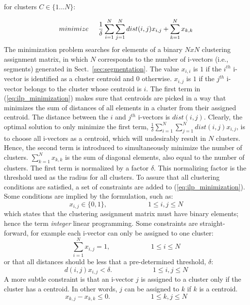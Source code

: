 for clusters $C \in \{1 ... N\}$:

\begin{equation}
\label{eq:ilp_minimization}
minimize \hspace{0.2in} \frac{1}{\delta}\sum\limits_{i=1}^{N}\sum\limits_{j=1}^{N}dist(i,j)x_{i,j} + \sum\limits_{k=1}^{N}x_{k,k}
\end{equation}
The minimization problem searches for elements of a binary $N x N$ clustering assignment matrix, in which $N$ corresponds to the number of i-vectors (i.e., segments) generated in Sect.~\ref{sec:segmentation}. 
The value $x_{i,i}$ is $1$ if the $i^{th}$ i-vector is identified as a cluster centroid and $0$ otherwise. 
$x_{i,j}$ is $1$ if the $j^{th}$ i-vector belongs to the cluster whose centroid is $i$. 
The first term in (\ref{eq:ilp_minimization}) makes sure that centroids are picked in a way that minimizes the sum of distances of all elements in a cluster from their assigned centroid. 
The distance between the $i$ and $j^{th}$ i-vectors is $dist(i,j)$. 
Clearly, the optimal solution to only minimize the first term, $\frac{1}{\delta}\sum\limits_{i=1}^{N}\sum\limits_{j=1}^{N}dist(i,j)x_{i,j}$, is to choose all i-vectors as a centroid, which will undesirably result in $N$ clusters. 
Hence, the second term is introduced to simultaneously minimize the number of clusters. $\sum\limits_{k=1}^{N}x_{k,k}$ is the sum of diagonal elements, also equal to the number of clusters. 
The first term is normalized by a factor $\delta$. 
This normalizing factor is the threshold used as the radius for all clusters. 
To assure that all clustering conditions are satisfied, a set of constraints are added to (\ref{eq:ilp_minimization}). 
Some conditions are implied by the formulation, such as: 
\begin{equation}
x_{i,j} \in \{0,1\},  \hspace{1in}  1 \leq i,j \leq N
\end{equation}
which states that the clustering assignment matrix must have binary elements; hence the term {\it integer} linear programming. 
Some constraints are straight-forward, for example each i-vector can only be assigned to one cluster: 
\begin{equation}
\sum\limits_{i=1}^{N}x_{i,j} = 1, \hspace{1in} 1 \leq i \leq N
\end{equation}
or that all distances should be less that a pre-determined threshold, $\delta$: 
\begin{equation}
d(i,j)x_{i,j} < \delta. \hspace{1in} 1 \leq i,j \leq N
\end{equation}
A more subtle constraint is that an i-vector $j$ is assigned to a cluster only if the cluster has a centroid. In other words, $j$ can be assigned to $k$ if $k$ is a centroid. 
\begin{equation}
x_{k,j} - x_{k,k} \leq 0. \hspace{1in} 1 \leq k,j \leq N
\end{equation}

